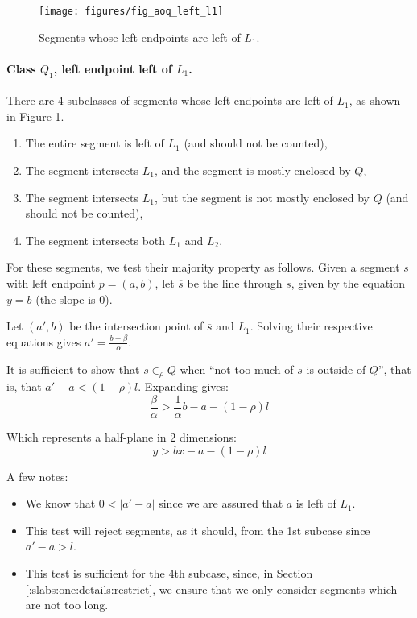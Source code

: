 \begin{figure}[t]
\begin{center}
  \texttt{[image: figures/fig\_aoq\_left\_l1]}
  \caption{Segments whose left endpoints are left of $L_1$.}
  \label{fig:slabs:one:aoq_left_l1}
\end{center}
\end{figure}

\paragraph{Class $Q_1$, left endpoint left of $L_1$.} There are 4 subclasses of segments whose left endpoints are left of $L_1$, as shown in Figure \ref{fig:slabs:one:aoq_left_l1}.

\begin{enumerate}
 \item The entire segment is left of $L_1$ (and should not be counted),

 \item The segment intersects $L_1$, and the segment is mostly enclosed by $Q$,

 \item The segment intersects $L_1$, but the segment is not mostly enclosed by $Q$ (and should not be counted),

 \item The segment intersects both $L_1$ and $L_2$. 

\end{enumerate}

For these segments, we test their majority property as follows. Given a segment $s$ with left endpoint $p = (a,b)$, let $\overline{s}$ be the line through $s$, given by the equation $y = b$ (the slope is 0).

Let $(a', b)$ be the intersection point of $\overline{s}$ and $L_1$. Solving their respective equations gives $a' = \frac{b - \beta}{\alpha}$.

It is sufficient to show that $s \in_\rho Q$ when ``not too much of $s$ is outside of $Q$'', that is, that $a' - a < (1 - \rho)l$. Expanding gives:
\[
\frac{\beta}{\alpha} > \frac{1}{\alpha} b - a - (1 - \rho)l 
\]

\noindent
Which represents a half-plane in 2 dimensions:
\[
y > bx - a - (1 - \rho)l 
\]

\noindent
A few notes: 
\begin{itemize}
 \item We know that $0 < |a' - a|$ since we are assured that $a$ is left of $L_1$.

 \item This test will reject segments, as it should, from the 1st subcase since $a' - a > l$.

 \item This test is sufficient for the 4th subcase, since, in Section \ref{:slabs:one:details:restrict}, we ensure that we only consider segments which are not too long.

\end{itemize}


